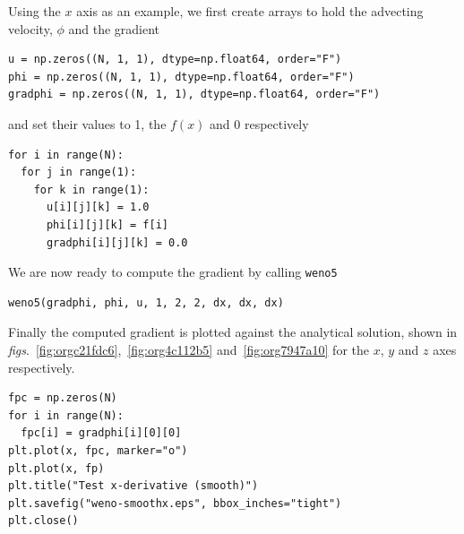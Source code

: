 \documentclass[11pt]{article}
\begin{document}
Using the \(x\) axis as an example, we first create arrays to hold the advecting velocity, \(\phi\) and the
gradient
\begin{lstlisting}
u = np.zeros((N, 1, 1), dtype=np.float64, order="F")
phi = np.zeros((N, 1, 1), dtype=np.float64, order="F")
gradphi = np.zeros((N, 1, 1), dtype=np.float64, order="F")
\end{lstlisting}
and set their values to 1, the \(f\left(x\right)\) and 0 respectively
\begin{lstlisting}
for i in range(N):
  for j in range(1):
    for k in range(1):
      u[i][j][k] = 1.0
      phi[i][j][k] = f[i]
      gradphi[i][j][k] = 0.0
\end{lstlisting}
We are now ready to compute the gradient by calling \texttt{weno5}
\begin{lstlisting}
weno5(gradphi, phi, u, 1, 2, 2, dx, dx, dx)
\end{lstlisting}
Finally the computed gradient is plotted against the analytical solution, shown in
\emph{figs}.~\ref{fig:orgc21fdc6},~\ref{fig:org4c112b5} and~\ref{fig:org7947a10} for the \(x\), \(y\) and \(z\)
axes respectively.
\begin{lstlisting}
fpc = np.zeros(N)
for i in range(N):
  fpc[i] = gradphi[i][0][0]
plt.plot(x, fpc, marker="o")
plt.plot(x, fp)
plt.title("Test x-derivative (smooth)")
plt.savefig("weno-smoothx.eps", bbox_inches="tight")
plt.close()
\end{lstlisting}
\end{document}
